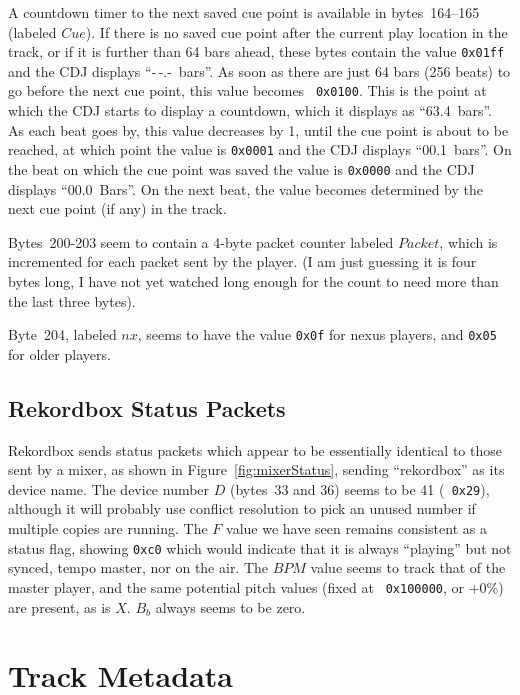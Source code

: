 \documentclass[11pt]{article}
\begin{document}
A countdown timer to the next saved cue point is available in
bytes~164--165 (labeled $Cue$). If there is no saved cue point after
the current play location in the track, or if it is further than 64
bars ahead, these bytes contain the value {\tt 0x01ff} and the CDJ
displays ``-\,-.-~bars''. As soon as there are just 64 bars (256
beats) to go before the next cue point, this value becomes {\tt
  0x0100}. This is the point at which the CDJ starts to display a
countdown, which it displays as ``63.4~bars''. As each beat goes by,
this value decreases by 1, until the cue point is about to be reached,
at which point the value is {\tt 0x0001} and the CDJ displays
``00.1~bars''. On the beat on which the cue point was saved the value
is {\tt 0x0000} and the CDJ displays ``00.0~Bars''. On the next beat,
the value becomes determined by the next cue point (if any) in the
track.

Bytes~200-203 seem to contain a 4-byte packet counter labeled
$Packet$, which is incremented for each packet sent by the player. (I
am just guessing it is four bytes long, I have not yet watched long
enough for the count to need more than the last three bytes).

Byte~204, labeled $nx$, seems to have the value {\tt 0x0f} for nexus
players, and {\tt 0x05} for older players.

\subsection{Rekordbox Status Packets}

Rekordbox sends status packets which appear to be essentially
identical to those sent by a mixer, as shown in
Figure~\ref{fig:mixerStatus}, sending ``rekordbox'' as its device
name. The device number $D$ (bytes~33 and 36) seems to be 41 ({\tt
  0x29}), although it will probably use conflict resolution to pick an
unused number if multiple copies are running. The $F$ value we have
seen remains consistent as a status flag, showing {\tt 0xc0} which
would indicate that it is always ``playing'' but not synced, tempo
master, nor on the air. The $BPM$ value seems to track that of the
master player, and the same potential pitch values (fixed at {\tt
  0x100000}, or +0\%) are present, as is $X$. $B_b$ always seems to be
zero.

\section{Track Metadata}
\label{sec:metadata}
\end{document}
